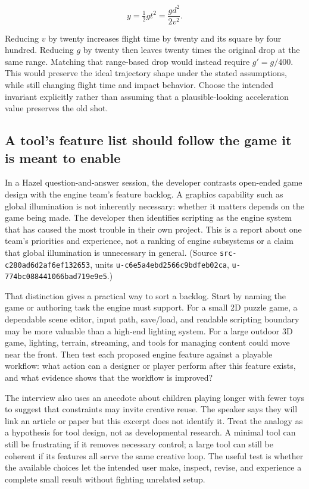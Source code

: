 \[
y=\tfrac12g t^2=\frac{g d^2}{2v^2}.
\]

Reducing \(v\) by twenty increases flight time by twenty and its square by four hundred. Reducing \(g\) by twenty then leaves twenty times the original drop at the same range. Matching that range-based drop would instead require \(g'=g/400\). This would preserve the ideal trajectory shape under the stated assumptions, while still changing flight time and impact behavior. Choose the intended invariant explicitly rather than assuming that a plausible-looking acceleration value preserves the old shot.

\subsection{A tool's feature list should follow the game it is meant to enable}\label{a-tools-feature-list-should-follow-the-game-it-is-meant-to-enable}

In a Hazel question-and-answer session, the developer contrasts open-ended game design with the engine team's feature backlog. A graphics capability such as global illumination is not inherently necessary: whether it matters depends on the game being made. The developer then identifies scripting as the engine system that has caused the most trouble in their own project. This is a report about one team's priorities and experience, not a ranking of engine subsystems or a claim that global illumination is unnecessary in general. (Source \texttt{src-c280ad6d2af6ef132653}, units \texttt{u-c6e5a4ebd2566c9bdfeb02ca}, \texttt{u-774bc088441066bad719e9e5}.)

That distinction gives a practical way to sort a backlog. Start by naming the game or authoring task the engine must support. For a small 2D puzzle game, a dependable scene editor, input path, save/load, and readable scripting boundary may be more valuable than a high-end lighting system. For a large outdoor 3D game, lighting, terrain, streaming, and tools for managing content could move near the front. Then test each proposed engine feature against a playable workflow: what action can a designer or player perform after this feature exists, and what evidence shows that the workflow is improved?

The interview also uses an anecdote about children playing longer with fewer toys to suggest that constraints may invite creative reuse. The speaker says they will link an article or paper but this excerpt does not identify it. Treat the analogy as a hypothesis for tool design, not as developmental research. A minimal tool can still be frustrating if it removes necessary control; a large tool can still be coherent if its features all serve the same creative loop. The useful test is whether the available choices let the intended user make, inspect, revise, and experience a complete small result without fighting unrelated setup.

